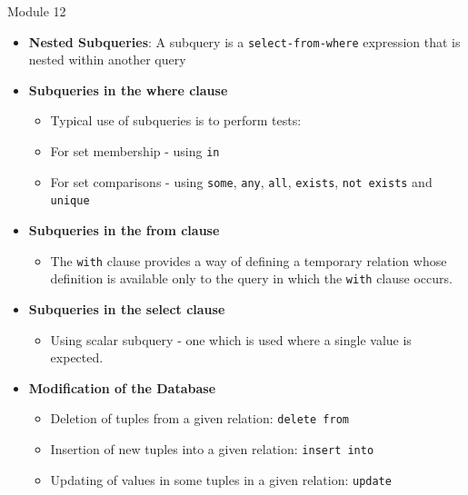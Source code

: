 \documentclass[aspectratio=169, xcolor=dvipsnames]{beamer}
\begin{document}
\begin{frame}{Module 12}
    \begin{itemize}[<+->]
        \item \textbf{Nested Subqueries}: A subquery is a \texttt{select-from-where} expression that is nested within another query
        \item \textbf{Subqueries in the where clause}
        \begin{itemize}
            \item[$\triangleright$] Typical use of subqueries is to perform tests:
            \item[$\triangleright$] For set membership - using \texttt{in}
            \item[$\triangleright$] For set comparisons - using \texttt{some}, \texttt{any}, \texttt{all}, \texttt{exists}, \texttt{not exists} and \texttt{unique}
        \end{itemize}
        \item \textbf{Subqueries in the from clause}
        \begin{itemize}
            \item[$\triangleright$] The \texttt{with} clause provides a way of defining a temporary relation whose definition is available only to the query in which the \texttt{with} clause occurs.
        \end{itemize}
        \item \textbf{Subqueries in the select clause}
        \begin{itemize}
            \item[$\triangleright$] Using scalar subquery - one which is used where a single value is expected.
        \end{itemize}
        \item \textbf{Modification of the Database}
        \begin{itemize}
            \item[$\triangleright$] Deletion of tuples from a given relation: \texttt{delete from}
            \item[$\triangleright$] Insertion of new tuples into a given relation: \texttt{insert into}
            \item[$\triangleright$] Updating of values in some tuples in a given relation: \texttt{update}
        \end{itemize}
    \end{itemize}
\end{frame}
\end{document}
